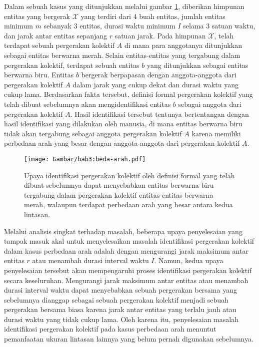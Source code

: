 Dalam sebuah kasus yang ditunjukkan melalui gambar \ref{bab3:masalah-arah}, diberikan himpunan entitas yang bergerak $\mathcal{X}$ yang terdiri dari 4 buah entitas, jumlah entitas minimum $m$ sebanyak $3$ entitas, durasi waktu minimum $I$ selama $3$ satuan waktu, dan jarak antar entitas sepanjang $r$ satuan jarak. Pada himpunan $\mathcal{X}$, telah terdapat sebuah pergerakan kolektif $A$ di mana para anggotanya ditunjukkan sebagai entitas berwarna merah. Selain entitas-entitas yang tergabung dalam pergerakan kolektif, terdapat sebuah entitas $b$ yang ditunjukkan sebagai entitas berwarna biru. Entitas $b$ bergerak berpapasan dengan anggota-anggota dari pergerakan kolektif $A$ dalam jarak yang cukup dekat dan durasi waktu yang cukup lama. Berdasarkan fakta tersebut, definisi formal pergerakan kolektif yang telah dibuat sebelumnya akan mengidentifikasi entitas $b$ sebagai anggota dari pergerakan kolektif $A$. Hasil identifikasi tersebut tentunya bertentangan dengan hasil identifikasi yang dilakukan oleh manusia, di mana entitas berwarna biru tidak akan tergabung sebagai anggota pergerakan kolektif $A$ karena memiliki perbedaan arah yang besar dengan anggota-anggota dari pergerakan kolektif $A$.

\begin{figure}[t]
    \centering
    \texttt{[image: Gambar/bab3:beda-arah.pdf]}
    \caption[Masalah identifikasi pada kasus perbedaan arah]{Upaya identifikasi pergerakan kolektif oleh definisi formal yang telah dibuat sebelumnya dapat menyebabkan entitas berwarna biru tergabung dalam pergerakan kolektif entitas-entitas berwarna merah, walaupun terdapat perbedaan arah yang besar antara kedua lintasan.}
    \label{bab3:masalah-arah}
\end{figure}
    
Melalui analisis singkat terhadap masalah, beberapa upaya penyelesaian yang tampak masuk akal untuk menyelesaikan masalah identifikasi pergerakan kolektif dalam kasus perbedaan arah adalah dengan mengurangi jarak maksimum antar entitas $r$ atau menambah durasi interval waktu $I$. Namun, kedua upaya penyelesaian tersebut akan mempengaruhi proses identifikasi pergerakan kolektif secara keseluruhan. Mengurangi jarak maksimum antar entitas atau menambah durasi interval waktu dapat menyebabkan sebuah pergerakan bersama yang sebelumnya dianggap sebagai sebuah pergerakan kolektif menjadi sebuah pergerakan bersama biasa karena jarak antar entitas yang terlalu jauh atau durasi waktu yang tidak cukup lama. Oleh karena itu, penyelesaian masalah identifikasi pergerakan kolektif pada kasus perbedaan arah menuntut pemanfaatan ukuran lintasan lainnya yang belum pernah digunakan sebelumnya.
    
